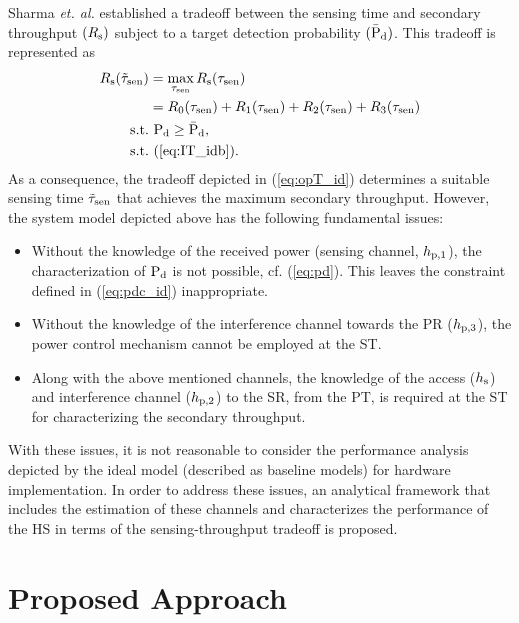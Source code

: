 Sharma \textit{et. al.} \cite{Sharma14} established a tradeoff between the sensing time and secondary throughput $(R_{\text{s}})$ subject to a target detection probability $(\bar{\text{P}}_{\text{d}})$. This tradeoff is represented as
\begin{align}
R_{\text{s}}(\tilde{\tau}_{\text{sen}}) &= \operatorname*{max}_{\tau_{\text{sen}}} R_{\text{s}}(\tau_{\text{sen}}) \label{eq:opT_id}\\ 
\quad &= R_{\text{0}}(\tau_{\text{sen}}) + R_{\text{1}}(\tau_{\text{sen}}) + R_{\text{2}}(\tau_{\text{sen}}) + R_{\text{3}}(\tau_{\text{sen}}) \nonumber  \\
\text{s.t.} & \text{ } \text{P}_{\text{d}} \ge \bar{\text{P}}_{\text{d}}, \label{eq:pdc_id} \\ 
\text{s.t.} & \text{ } (\ref{eq:IT_idb}). \nonumber
\end{align}
As a consequence, the tradeoff depicted in (\ref{eq:opT_id}) determines a suitable sensing time $\tilde{\tau}_{\text{sen}}$ that achieves the maximum secondary throughput.
However, the system model depicted above has the following fundamental issues:
\begin{itemize}
\item Without the knowledge of the received power (sensing channel, $h_{\text{p,1}}$), the characterization of $\text{P}_{\text{d}}$ is not possible, cf. (\ref{eq:pd}). This leaves the constraint defined in (\ref{eq:pdc_id}) inappropriate. 
\item Without the knowledge of the interference channel towards the PR ($h_{\text{p,3}}$), the power control mechanism cannot be employed at the ST.
\item Along with the above mentioned channels, the knowledge of the access ($h_{\text{s}}$) and interference channel ($h_{\text{p,2}}$) to the SR, from the PT, is required at the ST for characterizing the secondary throughput. 
\end{itemize} 
With these issues, it is not reasonable to consider the performance analysis depicted by the ideal model (described as baseline models) for hardware implementation. In order to address these issues, an analytical framework that includes the estimation of these channels and characterizes the performance of the HS in terms of the sensing-throughput tradeoff is proposed. 
\section{Proposed Approach} \label{sec:pm}
